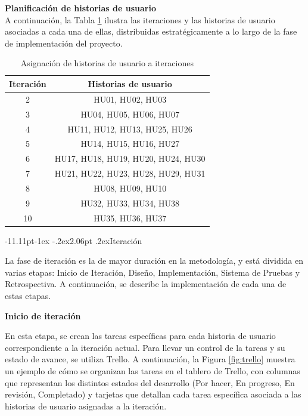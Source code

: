 \documentclass[12pt,letterpaper,oneside]{report}
\makeatletter
\renewcommand\subsection{\@startsection{subsection}{2}{\z@}%
  {-11.11pt\@plus -1ex \@minus -.2ex}{2.06pt \@plus .2ex}{\normalfont\normalsize\bfseries}}
\newcommand{\titulopar}[1]{\par\textbf{#1}\par}
\newcommand{\tituloparpegado}[1]{\par\textbf{#1}\\\indent\ignorespaces}
\makeatother
\begin{document}
\tituloparpegado{Planificación de historias de usuario}
A continuación, la Tabla \ref{tab:iteraciones} ilustra las iteraciones y las historias de usuario asociadas a cada una de ellas, distribuidas estratégicamente a lo largo de la fase de implementación del proyecto.
\begin{table}[h]
  \centering
  \caption{Asignación de historias de usuario a iteraciones}
  \label{tab:iteraciones}
  \renewcommand{\arraystretch}{1.2}
  \begin{tabular}{|c|c|}
    \hline
    \textbf{Iteración} & \textbf{Historias de usuario} \\
    \hline
    2 & HU01, HU02, HU03 \\ \hline
    3 & HU04, HU05, HU06, HU07 \\ \hline
    4 & HU11, HU12, HU13, HU25, HU26 \\ \hline
    5 & HU14, HU15, HU16, HU27 \\ \hline
    6 & HU17, HU18, HU19, HU20, HU24, HU30 \\ \hline
    7 & HU21, HU22, HU23, HU28, HU29, HU31 \\ \hline
    8 & HU08, HU09, HU10 \\ \hline
    9 & HU32, HU33, HU34, HU38 \\ \hline
    10 & HU35, HU36, HU37 \\ \hline
  \end{tabular}
\end{table}

\subsection{Iteración}

La fase de iteración es la de mayor duración en la metodología, y está dividida en varias etapas: Inicio de Iteración, Diseño, Implementación, Sistema de Pruebas y Retrospectiva. A continuación, se describe la implementación de cada una de estas etapas.

\titulopar{Inicio de iteración}

En esta etapa, se crean las tareas específicas para cada historia de usuario correspondiente a la iteración actual. Para llevar un control de la tareas y su estado de avance, se utiliza Trello. A continuación, la Figura \ref{fig:trello} muestra un ejemplo de cómo se organizan las tareas en el tablero de Trello, con columnas que representan los distintos estados del desarrollo (Por hacer, En progreso, En revisión, Completado) y tarjetas que detallan cada tarea específica asociada a las historias de usuario asignadas a la iteración.
\end{document}
